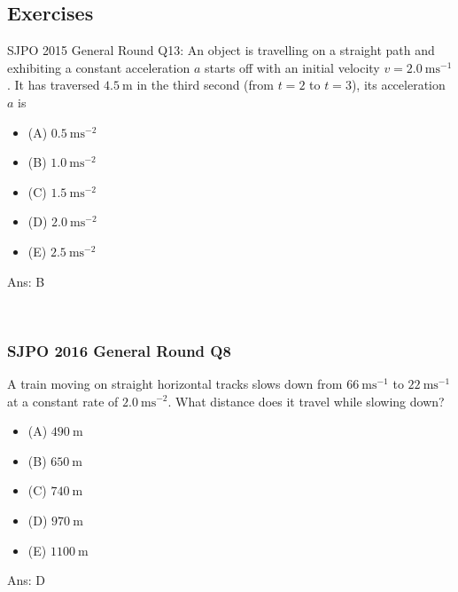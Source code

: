 \documentclass{article}
\begin{document}
\subsection{Exercises}
\begin{samepage}
    
SJPO 2015 General Round Q13: An object is travelling on a straight path and exhibiting a constant acceleration $a$ starts off with an initial velocity $v=2.0 \mathrm{~ms}^{-1}$. It has traversed $4.5 \mathrm{~m}$ in the third second (from $t=2$ to $t=3$), its acceleration $a$ is
\begin{itemize}\item[](A) $0.5 \mathrm{~ms}^{-2}$
 \item[](B) $1.0 \mathrm{~ms}^{-2}$
\item[](C) $1.5 \mathrm{~ms}^{-2}$
\item[](D) $2.0 \mathrm{~ms}^{-2}$
\item[](E) $2.5 \mathrm{~ms}^{-2}$
\end{itemize}
Ans: B
\end{samepage}
\\[20pt]
\begin{samepage}
\subsubsection{SJPO 2016 General Round Q8}
A train moving on straight horizontal tracks slows down from $66 \mathrm{~ms}^{-1}$ to $22 \mathrm{~ms}^{-1}$ at a constant rate of $2.0 \mathrm{~ms}^{-2}$. What distance does it travel while slowing down?
\begin{itemize}
\item[](A) $490 \mathrm{~m}$
\item[](B) $650 \mathrm{~m}$
\item[](C) $740 \mathrm{~m}$
\item[](D) $970 \mathrm{~m}$ 
\item[](E) $1100 \mathrm{~m}$ \end{itemize}
Ans: D
\end{samepage}
\end{document}
